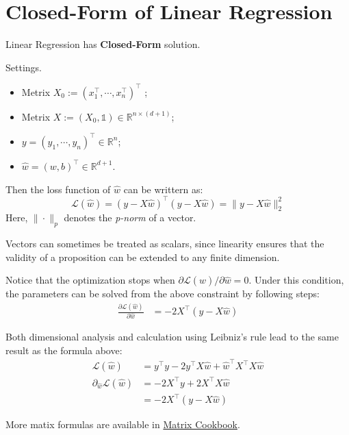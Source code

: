 \documentclass[../main]{subfiles}
\begin{document}
\section{Closed-Form of Linear Regression}
\begin{proposition}
  Linear Regression has \textbf{Closed-Form} solution.
\end{proposition}
Settings.
\begin{itemize}
  \item Metrix $X_0:=(x_1^\top,\cdots,x_n^{\top})^\top$ ; 
  \item Metrix $X:=(X_0,\mathbb 1)\in \mathbb R^{n\times(d+1)}$;
  \item $y=(y_1,\cdots,y_n)^\top\in\mathbb R^n$;
  \item $\hat w=(w,b)^\top\in\mathbb R^{d+1}$.
\end{itemize}
Then the loss function of $\hat w$ can be writtern as:
\begin{equation}
    \mathcal L(\hat w)=(y-X\hat w)^\top (y-X\hat w)=\|y-X\hat w\|_2^2
\end{equation}
Here, $\|\cdot\|_p$ denotes the \emph{p-norm} of a vector.
\begin{note}
  Vectors can sometimes be treated as scalars, since linearity ensures that the validity of a proposition can be extended to any finite dimension.  
\end{note}
Notice that the optimization stops when $\partial\mathcal L(\hat w)/\partial \hat w=0$. Under this condition, the parameters can be solved from the above constraint by following steps:
\begin{align}
  \frac{\partial\mathcal L(\hat w)}{\partial\hat w}&=-2X^\top(y-X\hat w)
\end{align}
\begin{note}
  Both dimensional analysis and calculation using Leibniz's rule lead to the same result as the formula above:
  \begin{align*}
      \mathcal L(\hat w)&=y^\top y-2y^\top X\hat w+\hat w^\top X^\top X\hat w\\
      \partial_{\hat w}\mathcal L(\hat w)&=-2X^\top y+2X^\top X\hat w\\
      &=-2 X^\top(y-X\hat w)
  \end{align*}
\end{note}
\begin{remark}
  More matix formulas are available in \href{https://www.math.uwaterloo.ca/~hwolkowi/matrixcookbook.pdf}{Matrix Cookbook}.
\end{remark}
\end{document}

